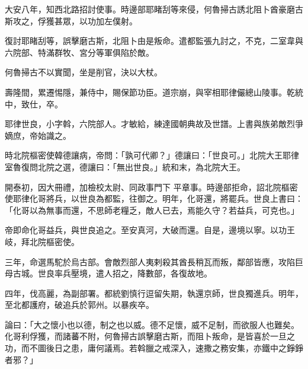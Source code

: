 \begin{pinyinscope}
 大安八年，知西北路招討使事。時邊部耶睹刮等來侵，何魯掃古誘北阻卜酋豪磨古斯攻之，俘獲甚眾，以功加左僕射。



 復討耶睹刮等，誤擊磨古斯，北阻卜由是叛命。遣都監張九討之，不克，二室韋與六院部、特滿群牧、宮分等軍俱陷於敵。



 何魯掃古不以實聞，坐是削官，決以大杖。



 壽隆間，累遷惕隱，兼侍中，賜保節功臣。道宗崩，與宰相耶律儼總山陵事。乾統中，致仕，卒。



 耶律世良，小字斡，六院部人。才敏給，練達國朝典故及世譜。上書與族弟敵烈爭嫡庶，帝始識之。



 時北院樞密使韓德讓病，帝問：「孰可代卿？」德讓曰：「世良可。」北院大王耶律室魯復問北院之選，德讓曰：「無出世良。」統和末，為北院大王。



 開泰初，因大冊禮，加檢校太尉、同政事門下
 平章事。時邊部拒命，詔北院樞密使耶律化哥將兵，以世良為都監，往御之。明年，化哥還，將罷兵。世良上書曰：「化哥以為無事而還，不思師老糧乏，敵人已去，焉能久守？若益兵，可克也。」



 帝即命化哥益兵，與世良追之。至安真河，大破而還。自是，邊境以寧。以功王岐，拜北院樞密使。



 三年，命選馬駝於烏古部。會敵烈部人夷剌殺其酋長稍瓦而叛，鄰部皆應，攻陷巨母古城。世良率兵壓境，遣人招之，降數部，各復故地。



 四年，伐高麗，為副部署。都統劉慎行逗留失期，執還京師，世良獨進兵。明年，至北都護府，破追兵於郭州。以暴疾卒。



 論曰：「大之懷小也以德，制之也以威。德不足懷，威不足制，而欲服人也難矣。化哥利俘獲，而諸蕃不附，何魯掃古誤擊磨古斯，而阻卜叛命，是皆喜於一旦之功，而不圖後日之患，庸何議焉。若斡臘之戒深入，速撒之務安集，亦鐵中之錚錚者邪？」



\end{pinyinscope}